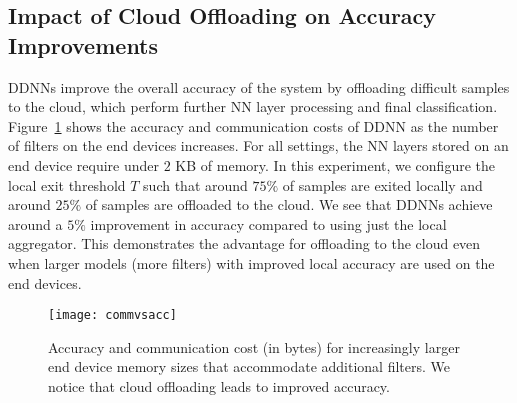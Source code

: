 \documentclass[10pt, conference, compsocconf]{IEEEtran}
\begin{document}
\subsection{Impact of Cloud Offloading on Accuracy Improvements}
DDNNs improve the overall accuracy of the system by offloading difficult samples to the cloud, which perform further NN layer processing and final classification.  Figure~\ref{fig:commvsacc} shows the accuracy and communication costs of DDNN as the number of filters on the end devices increases. For all settings, the NN layers stored on an end device require under $2$ KB of memory. In this experiment, we configure the local exit threshold $T$ such that around $75\%$ of samples are exited locally and around $25\%$ of samples are offloaded to the cloud. We see that DDNNs achieve around a $5\%$ improvement in accuracy compared to using just the local aggregator. This demonstrates the advantage for offloading to the cloud even when larger models (more filters) with improved local accuracy are used on the end devices.

\begin{figure}
    \centering
    \texttt{[image: commvsacc]}
    \caption{Accuracy and communication cost (in bytes) for increasingly larger end device memory sizes that accommodate additional filters. We notice that cloud offloading leads to improved accuracy.}
    \label{fig:commvsacc}
\end{figure}


\end{document}
